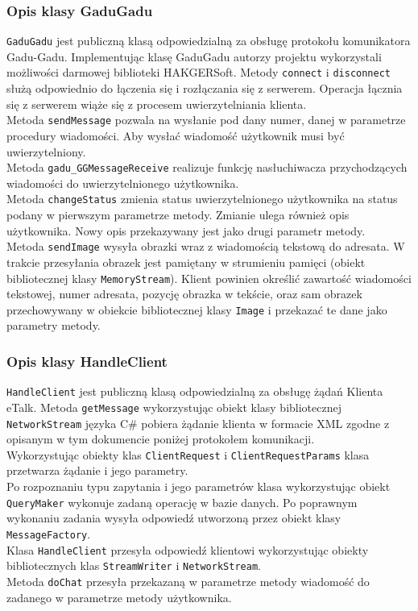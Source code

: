 \documentclass[a4paper,12pt]{article}
\begin{document}
\subsubsection[Opis klasy GaduGadu]{Opis klasy GaduGadu}
\texttt{GaduGadu} jest publiczną klasą odpowiedzialną za obsługę protokołu komunikatora Gadu-Gadu.
Implementując klasę GaduGadu autorzy projektu wykorzystali możliwości darmowej biblioteki HAKGERSoft.
Metody \texttt{connect} i \texttt{disconnect} służą odpowiednio do łączenia się i rozłączania się z serwerem.
Operacja łącznia się z serwerem wiąże się z procesem uwierzytelniania klienta.\\
Metoda \texttt{sendMessage} pozwala na wysłanie pod dany numer, danej w parametrze procedury wiadomości.
Aby wysłać wiadomość użytkownik musi być uwierzytelniony.\\
Metoda \texttt{gadu\_GGMessageReceive} realizuje funkcję nasłuchiwacza przychodzących wiadomości do uwierzytelnionego użytkownika.\\
Metoda \texttt{changeStatus} zmienia status uwierzytelnionego użytkownika na status podany w pierwszym parametrze metody. Zmianie ulega również opis użytkownika. Nowy opis przekazywany jest jako drugi parametr metody.\\
Metoda \texttt{sendImage} wysyła obrazki wraz z wiadomością tekstową do adresata. W trakcie przesyłania obrazek jest pamiętany w strumieniu pamięci (obiekt bibliotecznej klasy \texttt{MemoryStream}). Klient powinien określić zawartość wiadomości tekstowej, numer adresata, pozycję obrazka w tekście, oraz sam obrazek przechowywany w obiekcie bibliotecznej klasy \texttt{Image} i przekazać te dane jako parametry metody.

\subsubsection[Opis klasy HandleClient]{Opis klasy HandleClient}
\texttt{HandleClient} jest publiczną klasą odpowiedzialną za obsługę żądań Klienta eTalk. Metoda \texttt{getMessage}
wykorzystując obiekt klasy bibliotecznej \texttt{NetworkStream} języka C\# pobiera żądanie klienta w formacie XML zgodne z opisanym w tym dokumencie poniżej protokołem komunikacji.\\
Wykorzystując obiekty klas \texttt{ClientRequest} i \texttt{ClientRequestParams} klasa przetwarza żądanie i jego parametry. \\
Po rozpoznaniu typu zapytania i jego parametrów klasa wykorzystując obiekt \texttt{QueryMaker} wykonuje zadaną operację w bazie danych. Po poprawnym wykonaniu zadania wysyła odpowiedź utworzoną przez obiekt klasy \texttt{MessageFactory}.\\
Klasa \texttt{HandleClient} przesyła odpowiedź klientowi wykorzystując obiekty bibliotecznych klas \texttt{StreamWriter} i \texttt{NetworkStream}.\\
Metoda \texttt{doChat} przesyła przekazaną w parametrze metody wiadomość do zadanego w parametrze metody użytkownika.
\end{document}

